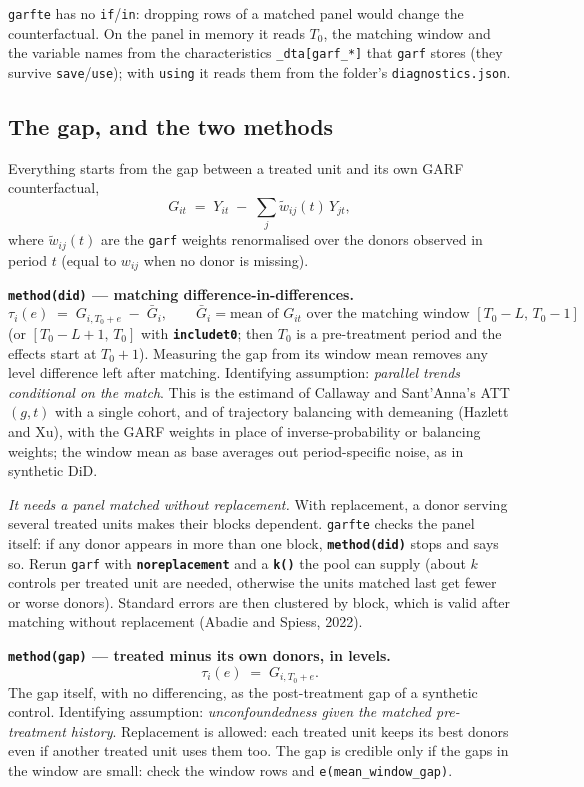 \documentclass[11pt,a4paper]{article}
\newcommand{\opt}[1]{\texttt{\textbf{#1}}}
\newcommand{\code}[1]{\texttt{#1}}
\begin{document}
\code{garfte} has no \code{if}/\code{in}: dropping rows of a matched panel would change the
counterfactual. On the panel in memory it reads $T_0$, the matching window and the variable names
from the characteristics \code{\_dta[garf\_*]} that \code{garf} stores (they survive
\code{save}/\code{use}); with \code{using} it reads them from the folder's \code{diagnostics.json}.

\subsection{The gap, and the two methods}
Everything starts from the gap between a treated unit and its own GARF counterfactual,
\[
G_{it} \;=\; Y_{it} \;-\; \sum_j \tilde w_{ij}(t)\, Y_{jt},
\]
where $\tilde w_{ij}(t)$ are the \code{garf} weights renormalised over the donors observed in
period $t$ (equal to $w_{ij}$ when no donor is missing).

\medskip
\noindent\textbf{\opt{method(did)} --- matching difference-in-differences.}
\[
\tau_i(e) \;=\; G_{i,T_0+e} \;-\; \bar G_i,\qquad
\bar G_i = \text{mean of } G_{it} \text{ over the matching window } [T_0-L,\,T_0-1]
\]
(or $[T_0-L+1,\,T_0]$ with \opt{includet0}; then $T_0$ is a pre-treatment period and the effects
start at $T_0+1$). Measuring the gap from its window mean removes any level difference left after
matching. Identifying assumption: \emph{parallel trends conditional on the match}. This is the
estimand of Callaway and Sant'Anna's ATT$(g,t)$ with a single cohort, and of trajectory balancing
with demeaning (Hazlett and Xu), with the GARF weights in place of inverse-probability or balancing
weights; the window mean as base averages out period-specific noise, as in synthetic DiD.

\emph{It needs a panel matched without replacement.} With replacement, a donor serving several
treated units makes their blocks dependent. \code{garfte} checks the panel itself: if any donor
appears in more than one block, \opt{method(did)} stops and says so. Rerun \code{garf} with
\opt{noreplacement} and a \opt{k()} the pool can supply (about $k$ controls per treated unit are
needed, otherwise the units matched last get fewer or worse donors). Standard errors are then
clustered by block, which is valid after matching without replacement (Abadie and Spiess, 2022).

\medskip
\noindent\textbf{\opt{method(gap)} --- treated minus its own donors, in levels.}
\[
\tau_i(e) \;=\; G_{i,T_0+e}.
\]
The gap itself, with no differencing, as the post-treatment gap of a synthetic control.
Identifying assumption: \emph{unconfoundedness given the matched pre-treatment history}.
Replacement is allowed: each treated unit keeps its best donors even if another treated unit uses
them too. The gap is credible only if the gaps in the window are small: check the window rows and
\code{e(mean\_window\_gap)}.
\end{document}
